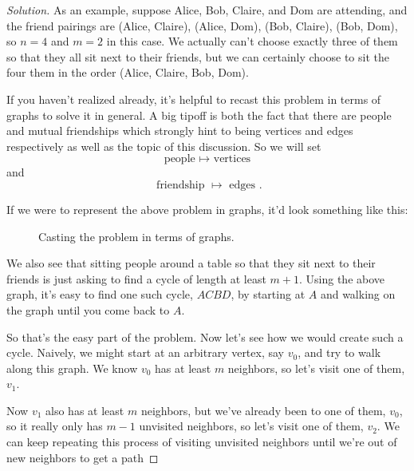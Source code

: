 \documentclass[11 pt]{scrartcl}
\begin{document}
\begin{proof}[Solution]

As an example, suppose Alice, Bob, Claire, and Dom are attending, and the friend pairings are (Alice, Claire), (Alice, Dom), (Bob, Claire), (Bob, Dom), so $n = 4$ and $m = 2$ in this case. 
We actually can't choose exactly three of them so that they all sit next to their friends, but we can certainly choose to sit the four them in the order (Alice, Claire, Bob, Dom). 

If you haven't realized already, it's helpful to recast this problem in terms of graphs to solve it in general. 
A big tipoff is both the fact that there are people and mutual friendships which strongly hint to being vertices and edges respectively as well as the topic of this discussion. So we will set 
\[ \text{ people }\mapsto \text{ vertices } \] 
and 
\[ \text{ friendship }\mapsto \text{ edges }.\] 

If we were to represent the above problem in graphs, it'd look something like this: 

\begin{figure}[!ht]
\begin{center}
\end{center}
\caption{Casting the problem in terms of graphs.}
\end{figure}

We also see that sitting people around a table so that they sit next to their friends is just asking to find a cycle of length at least $m+1$. Using the above graph, it's easy to find one such cycle, $ACBD$, by starting at $A$ and walking on the graph until you come back to $A$.  

So that's the easy part of the problem. Now let's see how we would create such a cycle. Naively, we might start at an arbitrary vertex, say $v_0$, and try to walk along this graph. We know $v_0$ has at least $m$ neighbors, so let's visit one of them, $v_1$. 

Now $v_1$ also has at least $m$ neighbors, but we've already been to one of them, $v_0$, so it really only has $m-1$ unvisited neighbors, so let's visit one of them, $v_2$. We can keep repeating this process of visiting unvisited neighbors until we're out of new neighbors to get a path 


\end{proof}
\end{document}
